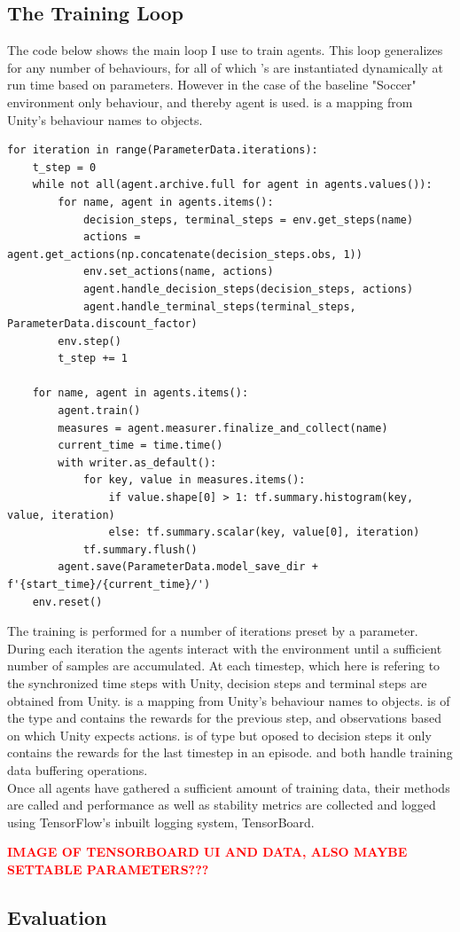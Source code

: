 \subsection{The Training Loop}\label{subsec:ip:tt:training_loop}
The code below shows the main loop I use to train agents. This loop generalizes for any number of behaviours, for all of which 's are instantiated dynamically at run time based on parameters. However in the case of the baseline "Soccer" environment only behaviour, and thereby agent is used.  is a mapping from Unity's behaviour names to  objects.
\begin{lstlisting}[basicstyle=\footnotesize]
for iteration in range(ParameterData.iterations):
    t_step = 0
    while not all(agent.archive.full for agent in agents.values()):
        for name, agent in agents.items():
            decision_steps, terminal_steps = env.get_steps(name)
            actions = agent.get_actions(np.concatenate(decision_steps.obs, 1))
            env.set_actions(name, actions)
            agent.handle_decision_steps(decision_steps, actions)
            agent.handle_terminal_steps(terminal_steps, ParameterData.discount_factor)
        env.step()
        t_step += 1
        
    for name, agent in agents.items():
        agent.train()
        measures = agent.measurer.finalize_and_collect(name)
        current_time = time.time()
        with writer.as_default():
            for key, value in measures.items():
                if value.shape[0] > 1: tf.summary.histogram(key, value, iteration)
                else: tf.summary.scalar(key, value[0], iteration)
            tf.summary.flush()
        agent.save(ParameterData.model_save_dir + f'{start_time}/{current_time}/')
    env.reset()
\end{lstlisting}
\noindent
The training is performed for a number of iterations preset by a parameter. During each iteration the agents interact with the environment until a sufficient number of samples are accumulated. At each timestep, which here is refering to the synchronized time steps with Unity, decision steps and terminal steps are obtained from Unity.  is a mapping from Unity's behaviour names to  objects.  is of the type  and contains the rewards for the previous step, and observations based on which Unity expects actions.
 is of type  but oposed to decision steps it only contains the rewards for the last timestep in an episode.  and  both handle training data buffering operations.
\noindent
\\ Once all agents have gathered a sufficient amount of training data, their  methods are called and performance as well as stability metrics are collected and logged using TensorFlow's inbuilt logging system, TensorBoard.

\textcolor{red}{\textbf{IMAGE OF TENSORBOARD UI AND DATA, ALSO MAYBE SETTABLE PARAMETERS???}}
\subsection{Evaluation}\label{subsec:ip:tt:eval}

